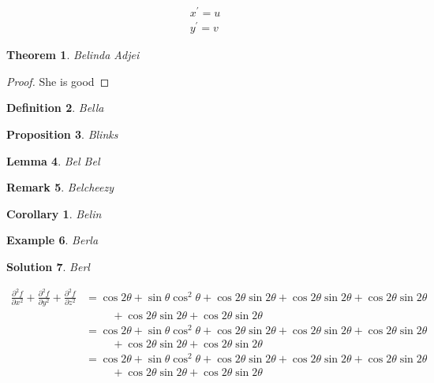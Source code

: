 \documentclass[12pt]{article}
\newtheorem{theorem}{Theorem}[section]
\newtheorem{definition}[theorem]{Definition}
\newtheorem{proposition}[theorem]{Proposition}
\newtheorem{remark}[theorem]{Remark}
\newtheorem{example}[theorem]{Example}
\newtheorem{solution}[theorem]{Solution}
\newtheorem{corollary}{Corollary}[theorem]
\newtheorem{lemma}[theorem]{Lemma}
\begin{document}
{\color{red}
{
\begin{equation}\tag{2} \label{eqn2}
\begin{split}
 x^\prime = u \\
 y^\prime = v
 \end{split}
\end{equation}
}}

\begin{theorem}
Belinda Adjei
\end{theorem}

\begin{proof}
She is good 
\end{proof}

\begin{definition}
Bella
\end{definition}

\begin{proposition}
Blinks
\end{proposition}

\begin{lemma}
Bel Bel
\end{lemma}

\begin{remark}
Belcheezy
\end{remark}

\begin{corollary}
Belin
\end{corollary}

\begin{example}
Berla
\end{example}

\begin{solution}
Berl
\end{solution}

\begin{equation}
\begin{split}
\frac{\partial^2f}{\partial x^2} + \frac{\partial^2f}{\partial y^2} + \frac{\partial^2f}{\partial z^2} &= \cos 2\theta + \sin \theta \cos^2\theta + \cos 2\theta \sin 2 \theta +\cos 2\theta  \sin 2 \theta + \cos 2\theta \sin 2 \theta \\
&\hspace{1cm}+ \cos 2\theta \sin 2 \theta+ \cos 2\theta \sin 2 \theta \\
&= \cos 2\theta + \sin \theta \cos^2\theta + \cos 2\theta \sin 2 \theta +\cos 2\theta  \sin 2 \theta + \cos 2\theta \sin 2 \theta \\
& \hspace{1cm} + \cos 2\theta \sin 2 \theta+ \cos 2\theta \sin 2 \theta \\
&= \cos 2\theta + \sin \theta \cos^2\theta + \cos 2\theta \sin 2 \theta +\cos 2\theta  \sin 2 \theta + \cos 2\theta \sin 2 \theta \\
&\hspace{1cm}+ \cos 2\theta \sin 2 \theta+ \cos 2\theta \sin 2 \theta
\end{split}
\end{equation}
\end{document}
